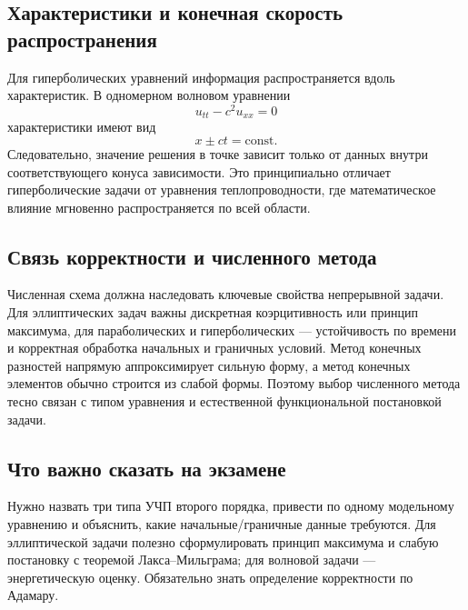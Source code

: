 \subsection{Характеристики и конечная скорость распространения}

Для гиперболических уравнений информация распространяется вдоль
характеристик. В одномерном волновом уравнении
\[
    u_{tt}-c^2u_{xx}=0
\]
характеристики имеют вид
\[
    x\pm ct=\text{const}.
\]
Следовательно, значение решения в точке зависит только от данных внутри
соответствующего конуса зависимости. Это принципиально отличает гиперболические
задачи от уравнения теплопроводности, где математическое влияние мгновенно
распространяется по всей области.

\subsection{Связь корректности и численного метода}

Численная схема должна наследовать ключевые свойства непрерывной задачи.
Для эллиптических задач важны дискретная коэрцитивность или принцип максимума,
для параболических и гиперболических --- устойчивость по времени и корректная
обработка начальных и граничных условий. Метод конечных разностей напрямую
аппроксимирует сильную форму, а метод конечных элементов обычно строится из
слабой формы. Поэтому выбор численного метода тесно связан с типом уравнения и
естественной функциональной постановкой задачи.

\subsection{Что важно сказать на экзамене}

Нужно назвать три типа УЧП второго порядка, привести по одному модельному
уравнению и объяснить, какие начальные/граничные данные требуются. Для
эллиптической задачи полезно сформулировать принцип максимума и слабую
постановку с теоремой Лакса--Мильграма; для волновой задачи --- энергетическую
оценку. Обязательно знать определение корректности по Адамару.

\newpage
